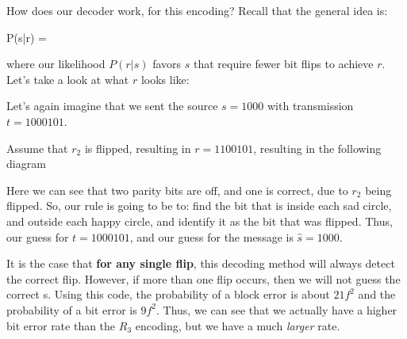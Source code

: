 How does our decoder work, for this encoding?
Recall that the general idea is:
\begin{frml}
	P(s|r) = 
\end{frml}

where our likelihood $P(r|s)$ favors $s$ that require fewer bit flips to achieve $r$.
Let's take a look at what $r$ looks like:

\begin{center}
\end{center}

Let's again imagine that we sent the source 
$s = 1000$ with transmission $t = 1000101$.

Assume that $r_2$ is flipped, resulting in $r = 1100101$,
resulting in the following diagram

\begin{center}
\end{center}

Here we can see that two parity bits are off, and one is correct, due to $r_2$
being flipped. So, our rule is going to be to: find the bit that is inside
each sad circle, and outside each happy circle, and identify it as the bit
that was flipped. Thus, our guess for $t = 1000101$, and our guess for the
message is $\hat s = 1000$.

It is the case that  \textbf{for any single flip}, this decoding method will always
detect the correct flip. However, if more than one flip occurs, then we will not
guess the correct s.
Using this code, the probability of a block error is about $21f^2$ and the probability
of a bit error is $9f^2$. Thus, we can see that we actually have a higher bit error
rate than the $R_3$ encoding, but we have a much \textit{larger} rate.

